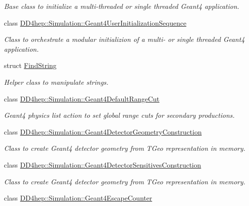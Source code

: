 \begin{DoxyCompactItemize}
\begin{DoxyCompactList}\small\item\em Base class to initialize a multi-\/threaded or single threaded Geant4 application. \end{DoxyCompactList}\item 
class \hyperlink{class_d_d4hep_1_1_simulation_1_1_geant4_user_initialization_sequence}{D\+D4hep\+::\+Simulation\+::\+Geant4\+User\+Initialization\+Sequence}
\begin{DoxyCompactList}\small\item\em Class to orchestrate a modular initializion of a multi-\/ or single threaded Geant4 application. \end{DoxyCompactList}\item 
struct \hyperlink{struct_find_string}{Find\+String}
\begin{DoxyCompactList}\small\item\em Helper class to manipulate strings. \end{DoxyCompactList}\item 
class \hyperlink{class_d_d4hep_1_1_simulation_1_1_geant4_default_range_cut}{D\+D4hep\+::\+Simulation\+::\+Geant4\+Default\+Range\+Cut}
\begin{DoxyCompactList}\small\item\em Geant4 physics list action to set global range cuts for secondary productions. \end{DoxyCompactList}\item 
class \hyperlink{class_d_d4hep_1_1_simulation_1_1_geant4_detector_geometry_construction}{D\+D4hep\+::\+Simulation\+::\+Geant4\+Detector\+Geometry\+Construction}
\begin{DoxyCompactList}\small\item\em Class to create Geant4 detector geometry from T\+Geo representation in memory. \end{DoxyCompactList}\item 
class \hyperlink{class_d_d4hep_1_1_simulation_1_1_geant4_detector_sensitives_construction}{D\+D4hep\+::\+Simulation\+::\+Geant4\+Detector\+Sensitives\+Construction}
\begin{DoxyCompactList}\small\item\em Class to create Geant4 detector geometry from T\+Geo representation in memory. \end{DoxyCompactList}\item 
class \hyperlink{class_d_d4hep_1_1_simulation_1_1_geant4_escape_counter}{D\+D4hep\+::\+Simulation\+::\+Geant4\+Escape\+Counter}

\end{DoxyCompactItemize}
